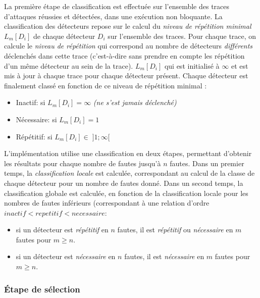                  La première étape de classification est effectuée sur l'ensemble des traces d'attaques réussies et détectées, dans une exécution non bloquante.
                 La classification des détecteurs repose sur le calcul du \textit{niveau de répétition minimal} $L_m[D_i]$ de chaque détecteur $D_i$ sur l'ensemble des traces.              
                 Pour chaque trace, on calcule le \textit{niveau de répétition} qui correspond au nombre de détecteurs \textit{différents} déclenchés dans cette trace (c'est-à-dire sans prendre en compte les répétition d'un même détecteur au sein de la trace).
                 $L_m[D_i]$ qui est initialisé à $\infty$ et est mis à jour à chaque trace pour chaque détecteur présent.
                 Chaque détecteur est finalement classé en fonction de ce niveau de répétition minimal :
                \begin{itemize}
                    \item Inactif: si $L_m[D_i] = \infty$ \textit{(ne s'est jamais déclenché)}
                    \item Nécessaire: si $L_m[D_i] = 1$
                    \item Répétitif: si $L_m[D_i] \in \; ]1; \infty[$
                \end{itemize}
    
                L'implémentation utilise une classification en deux étapes, permettant d'obtenir les résultats pour chaque nombre de fautes jusqu'à $n$ fautes.
                Dans un premier temps, la \textit{classification locale} est calculée, correspondant au calcul de la classe de chaque détecteur pour un nombre de fautes donné.
                Dans un second temps, la classification globale est calculée, en fonction de la classification locale pour les nombres de fautes inférieurs (correspondant à une relation d'ordre $inactif < repetitif < necessaire$:
                \begin{itemize}
                    \item si un détecteur est \textit{répétitif} en $n$ fautes, il est \textit{répétitif} ou \textit{nécessaire} en $m$ fautes pour $m \geq n$.
                    \item si un détecteur est \textit{nécessaire} en $n$ fautes, il est \textit{nécessaire} en $m$ fautes pour $m \geq n$.
                \end{itemize}
                
            \subsubsection{Étape de sélection}
            \label{sec:ch6-impl-selection}
    
